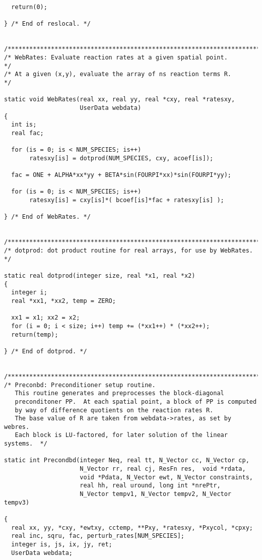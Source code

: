 \begin{verbatim}
  return(0);

} /* End of reslocal. */


/*************************************************************************/
/* WebRates: Evaluate reaction rates at a given spatial point.           */
/* At a given (x,y), evaluate the array of ns reaction terms R.          */

static void WebRates(real xx, real yy, real *cxy, real *ratesxy,
                     UserData webdata)
{
  int is;
  real fac;

  for (is = 0; is < NUM_SPECIES; is++)
       ratesxy[is] = dotprod(NUM_SPECIES, cxy, acoef[is]);

  fac = ONE + ALPHA*xx*yy + BETA*sin(FOURPI*xx)*sin(FOURPI*yy);

  for (is = 0; is < NUM_SPECIES; is++)
       ratesxy[is] = cxy[is]*( bcoef[is]*fac + ratesxy[is] );

} /* End of WebRates. */


/*************************************************************************/
/* dotprod: dot product routine for real arrays, for use by WebRates.    */

static real dotprod(integer size, real *x1, real *x2)
{
  integer i;
  real *xx1, *xx2, temp = ZERO;

  xx1 = x1; xx2 = x2;
  for (i = 0; i < size; i++) temp += (*xx1++) * (*xx2++);
  return(temp);

} /* End of dotprod. */


/*************************************************************************/
/* Preconbd: Preconditioner setup routine.
   This routine generates and preprocesses the block-diagonal
   preconditoner PP.  At each spatial point, a block of PP is computed
   by way of difference quotients on the reaction rates R.
   The base value of R are taken from webdata->rates, as set by webres.
   Each block is LU-factored, for later solution of the linear systems.  */

static int Precondbd(integer Neq, real tt, N_Vector cc, N_Vector cp,
                     N_Vector rr, real cj, ResFn res,  void *rdata,
                     void *Pdata, N_Vector ewt, N_Vector constraints,
                     real hh, real uround, long int *nrePtr, 
                     N_Vector tempv1, N_Vector tempv2, N_Vector tempv3)

{
  real xx, yy, *cxy, *ewtxy, cctemp, **Pxy, *ratesxy, *Pxycol, *cpxy;
  real inc, sqru, fac, perturb_rates[NUM_SPECIES];
  integer is, js, ix, jy, ret;
  UserData webdata;


\end{verbatim}
